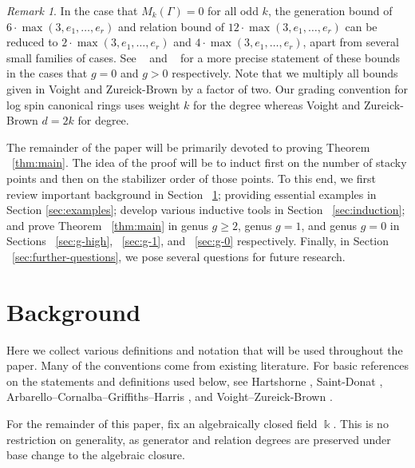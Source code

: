 \documentclass{amsart}
\theoremstyle{plain}
\theoremstyle{definition}
\theoremstyle{remark}
\newtheorem{rem}[thm]{Remark}
\numberwithin{equation}{section}
\newcommand\Bk{{\Bbbk}}
\begin{document}
\begin{rem}
\label{rem:factor-two}
In the case that $M_k(\Gamma) = 0$ for all odd $k$, the generation bound of $6 \cdot \max(3, e_1, \ldots, e_r)$ and relation
bound of $12 \cdot \max(3, e_1, \ldots, e_r)$ can be reduced to $2\cdot \max(3,e_1, \ldots, e_r)$ and $4 \cdot \max(3,e_1, \ldots, e_r)$, apart from several small families of cases. See 
~\cite[Theorem 9.3.1]{vzb:stacky} and ~\cite[Theorem 8.7.1]{vzb:stacky} for a more precise statement of these bounds in the cases that $g = 0$ and $g > 0$ respectively. Note that we multiply all bounds given in Voight and Zureick-Brown \cite{vzb:stacky} by a factor of two. Our grading convention for log spin canonical rings uses weight $k$ for the degree whereas Voight and Zureick-Brown $d = 2k$ for degree.
\end{rem}

The remainder of the paper will be primarily devoted to proving
Theorem ~\ref{thm:main}. The idea of the
proof will be to induct first on the number of stacky points and then on the stabilizer order of those points.  To this end, we first review important background in
Section ~\ref{sec:background}; providing essential examples in Section \ref{sec:examples}; develop various inductive
tools in Section ~\ref{sec:induction}; and prove Theorem ~\ref{thm:main} in genus $g\ge 2$, genus $g=1$, and genus $g=0$ in Sections ~\ref{sec:g-high},
~\ref{sec:g-1}, and ~\ref{sec:g-0} respectively.  
Finally, in Section
~\ref{sec:further-questions}, we pose several questions for future
research.


\section{Background}
\label{sec:background}
Here we collect various definitions and notation that will be
used throughout the paper. Many of the conventions come from existing
literature. For basic references on the statements and definitions
used below, see Hartshorne \cite[Chapter IV]{hartshorne:ag},
Saint-Donat \cite{saint-donat:proj}, Arbarello--Cornalba--Griffiths--Harris 
\cite[Section III.2]
{acgh:algebraic-curves}, and Voight--Zureick-Brown \cite[Chapter 2,
Chapter 5]{vzb:stacky}.

For the remainder of this paper, fix an algebraically closed field $\Bk$.
This is no restriction on generality, as generator and relation degrees are preserved under base change to the algebraic closure.
\end{document}
